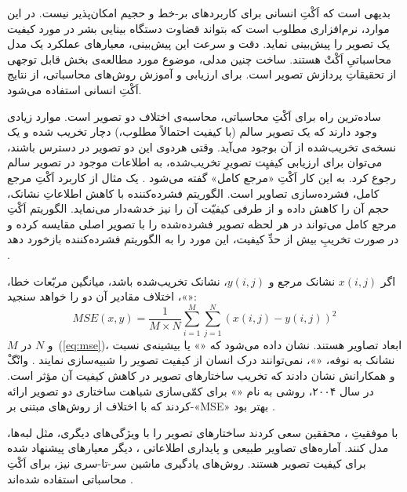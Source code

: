 \documentclass[twocolumn]{article}
\begin{document}
بدیهی است که اَکْتِ انسانی برای کاربردهای بر-خط و حجیم امکان‌پذیر نیست. در این موارد، نرم‌افزاری مطلوب است که بتواند قضاوت دستگاه بینایی بشر در مورد کیفیت یک تصویر را پیش‌بینی نماید. دقت و سرعت این پیش‌بینی، معیارهای عملکرد یک مدل محاسباتیِ اَکْتْ هستند. ساخت چنین مدلی، موضوع مورد مطالعه‌ی بخش قابل توجهی از تحقیقاتِ پردازش تصویر است\cite{zhai2020perceptual}. برای ارزیابی و آموزش روش‌های محاسباتی، از نتایج اَکْتِ انسانی استفاده می‌شود.

ساده‌ترین راه برای اَکْتِ محاسباتی، محاسبه‌ی اختلاف دو تصویر است. موارد زیادی وجود دارند که یک تصویر سالم (با کیفیت احتمالاً مطلوب،) دچار تخریب شده و یک نسخه‌ی تخریب‌شده از آن بوجود می‌آید. وقتی هردوی این دو تصویر در دسترس باشند، می‌توان برای ارزیابی کیفیِت تصویرِ تخریب‌شده، به اطلاعات موجود در تصویر سالم رجوع کرد. به این کار اَکْتِ «مرجع کامل» گفته می‌شود \cite{larson2010most}. یک مثال از کاربرد اَکْتِ مرجع کامل، فشرده‌سازی تصاویر است. الگوریتم فشرده‌کننده با کاهش اطلاعاتِ نشانک، حجم آن را کاهش داده و از طرفی کیفیّت آن را نیز خدشه‌دار می‌نماید. الگوریتم اَکْتِ مرجع کامل می‌تواند در هر لحظه تصویر فشرده‌شده را با تصویر اصلی مقایسه کرده و در صورت تخریبِ بیش از حدِّ کیفیت، این مورد را به الگوریتم فشرده‌کننده بازخورد دهد \cite{eckert1998perceptual}.

اگر $x(i, j)$ نشانک مرجع و $y(i, j)$، نشانک تخریب‌شده باشد، میانگین مربّعات خطا، «»، اختلاف مقادیر آن دو را خواهد سنجید:
\begin{equation}
	MSE(x, y) = \displaystyle \frac{1}{M\times N} \sum_{i=1}^M\sum_{j=1}^N (x(i, j)- y(i, j))^2
\label{eq:mse}
\end{equation}
$M$ و $N$ در~(\ref{eq:mse})، ابعاد تصاویر هستند. 
نشان داده می‌شود که «» یا بیشینه‌ی نسبت نشانک به نوفه، «»، نمی‌توانند درک انسان از کیفیت تصویر را شبیه‌سازی نمایند \cite{wang2009mean}. وانْگْ و همکارانش نشان دادند که تخریب ساختارهای تصویر در کاهش کیفیت آن مؤثر است\cite{wang2009mean}. در سال ۲۰۰۴، روشی به نام «» برای کمّی‌سازی شباهت ساختاری دو تصویر ارائه کردند \cite{wang2004image} که با اختلاف از روش‌های مبتنی بر-«MSE» بهتر بود \cite{sheikh2006statistical}.  

با موفقیتِ ، محققین سعی کردند ساختارهای تصویر را با ویژگی‌های دیگری، مثل لبه‌ها، مدل کنند. آماره‌های تصاویر طبیعی \cite{ruderman1994statistics} و پایداری اطلاعاتی \cite{sheikh2006image}، دیگر معیارهای پیشنهاد شده برای کیفیت تصویر هستند. روش‌های یادگیری ماشین سر-تا-سری نیز، برای اَکْتِ محاسباتی استفاده شده‌اند \cite{kim2017deep, yang2019survey, ye2012unsupervised}.
\end{document}
